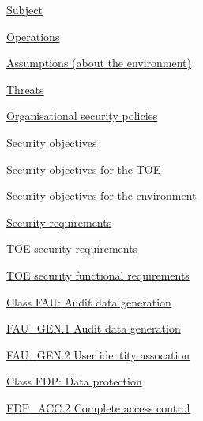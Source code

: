 \documentclass[10pt,a4paper,english]{article}
\begin{document}
\begin{list}{}{}
\begin{list}{}{}
\item {} \href{\#subject}{Subject}

\item {} \href{\#operations}{Operations}

\item {} \href{\#assumptions-about-the-environment}{Assumptions (about the environment)}

\item {} \href{\#threats}{Threats}

\item {} \href{\#organisational-security-policies}{Organisational security policies}

\end{list}

\item {} \href{\#security-objectives}{Security objectives}
\begin{list}{}{}
\item {} \href{\#security-objectives-for-the-toe}{Security objectives for the TOE}

\item {} \href{\#security-objectives-for-the-environment}{Security objectives for the environment}

\end{list}

\item {} \href{\#security-requirements}{Security requirements}
\begin{list}{}{}
\item {} \href{\#toe-security-requirements}{TOE security requirements}
\begin{list}{}{}
\item {} \href{\#toe-security-functional-requirements}{TOE security functional requirements}
\begin{list}{}{}
\item {} \href{\#class-fau-audit-data-generation}{Class FAU: Audit data generation}
\begin{list}{}{}
\item {} \href{\#fau-gen-1-audit-data-generation}{FAU{\_}GEN.1 Audit data generation}

\item {} \href{\#fau-gen-2-user-identity-assocation}{FAU{\_}GEN.2 User identity assocation}

\end{list}

\item {} \href{\#class-fdp-data-protection}{Class FDP: Data protection}
\begin{list}{}{}
\item {} \href{\#fdp-acc-2-complete-access-control}{FDP{\_}ACC.2 Complete access control}


\end{list}
\end{list}
\end{list}
\end{list}
\end{list}
\end{document}
